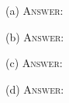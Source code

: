(a)
\textsc{Answer:}\vspace{-2mm}
\begin{answerlong}
\end{answerlong}

(b)
\textsc{Answer:}\vspace{-2mm}
\begin{answerlong}

\end{answerlong}

(c)
\textsc{Answer:}\vspace{-2mm}
\begin{answerlong}

\end{answerlong}

(d)
\textsc{Answer:}\vspace{-2mm}
\begin{answerlong}

\end{answerlong}
